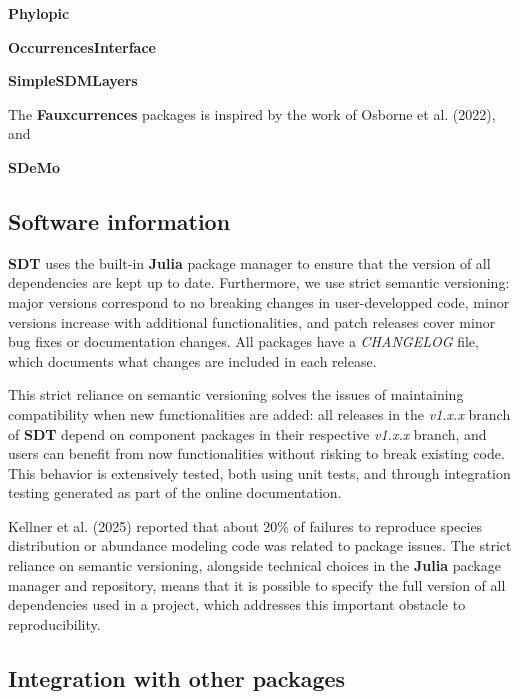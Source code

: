 \documentclass[
]{article}
\begin{document}
\textbf{Phylopic}

\textbf{OccurrencesInterface}

\textbf{SimpleSDMLayers}

The \textbf{Fauxcurrences} packages is inspired by the work of Osborne
et al. (2022), and

\textbf{SDeMo}

\subsection{Software information}\label{software-information}

\textbf{SDT} uses the built-in \textbf{Julia} package manager to ensure
that the version of all dependencies are kept up to date. Furthermore,
we use strict semantic versioning: major versions correspond to no
breaking changes in user-developped code, minor versions increase with
additional functionalities, and patch releases cover minor bug fixes or
documentation changes. All packages have a \emph{CHANGELOG} file, which
documents what changes are included in each release.

This strict reliance on semantic versioning solves the issues of
maintaining compatibility when new functionalities are added: all
releases in the \emph{v1.x.x} branch of \textbf{SDT} depend on component
packages in their respective \emph{v1.x.x} branch, and users can benefit
from now functionalities without risking to break existing code. This
behavior is extensively tested, both using unit tests, and through
integration testing generated as part of the online documentation.

Kellner et al. (2025) reported that about 20\% of failures to reproduce
species distribution or abundance modeling code was related to package
issues. The strict reliance on semantic versioning, alongside technical
choices in the \textbf{Julia} package manager and repository, means that
it is possible to specify the full version of all dependencies used in a
project, which addresses this important obstacle to reproducibility.

\subsection{Integration with other
packages}\label{integration-with-other-packages}
\end{document}
